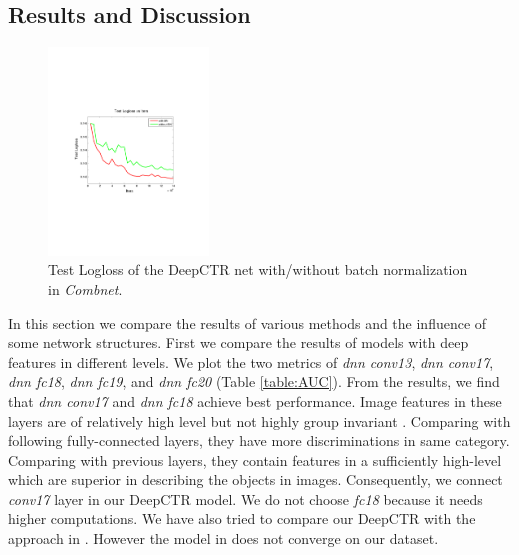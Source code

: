 \documentclass{sig-alternate}
\begin{document}
\subsection{Results and Discussion}
\begin{figure}
	\centering
	\includegraphics[width=0.38\textwidth]{BN_test}
	\caption{Test Logloss of the DeepCTR net with/without batch normalization in \emph{Combnet}. }
	\label{fig:bn}
\end{figure} 
In this section we compare the results of various methods and the influence of some network structures. First we compare the results of  models with deep features in different levels. We plot the two metrics of \emph{dnn conv13}, \emph{dnn conv17}, \emph{dnn fc18}, \emph{dnn fc19}, and \emph{dnn fc20} (Table \ref{table:AUC}). From the results, we find that \emph{dnn conv17} and \emph{dnn fc18} achieve best performance. Image features in these layers are of relatively high level but not highly group invariant \cite{zeiler2014visualizing}. Comparing with following fully-connected layers, they have more discriminations in same category. Comparing with previous layers, they contain  features in a sufficiently high-level  which are superior in describing the objects in images. Consequently, we connect \emph{conv17} layer in our DeepCTR model. We do not choose \emph{fc18} because it needs higher computations. We have also tried to compare our DeepCTR with the approach in \cite{Mo:2015:IFL:2832747.2832769}. However the model in \cite{Mo:2015:IFL:2832747.2832769} does not converge on our dataset.
\end{document}
